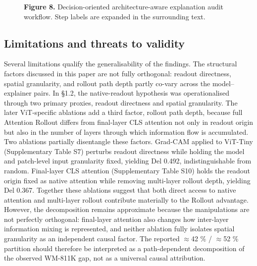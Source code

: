 \documentclass[11pt,a4paper]{article}
\begin{document}
\begin{figure}[htbp]
{
}
\caption{\textbf{Figure 8.} Decision-oriented architecture-aware explanation audit workflow. Step labels are expanded in the surrounding text.}
\end{figure}

\subsection{Limitations and threats to validity}

Several limitations qualify the generalisability of the findings. The structural factors discussed in this paper are not fully orthogonal: readout directness, spatial granularity, and rollout path depth partly co-vary across the model--explainer pairs. In \S{}1.2, the native-readout hypothesis was operationalised through two primary proxies, readout directness and spatial granularity. The later ViT-specific ablations add a third factor, rollout path depth, because full Attention Rollout differs from final-layer CLS attention not only in readout origin but also in the number of layers through which information flow is accumulated. Two ablations partially disentangle these factors. Grad-CAM applied to ViT-Tiny (Supplementary Table S7) perturbs readout directness while holding the model and patch-level input granularity fixed, yielding Del 0.492, indistinguishable from random. Final-layer CLS attention (Supplementary Table S10) holds the readout origin fixed as native attention while removing multi-layer rollout depth, yielding Del 0.367. Together these ablations suggest that both direct access to native attention and multi-layer rollout contribute materially to the Rollout advantage. However, the decomposition remains approximate because the manipulations are not perfectly orthogonal: final-layer attention also changes how inter-layer information mixing is represented, and neither ablation fully isolates spatial granularity as an independent causal factor. The reported $\approx$42 \% / $\approx$52 \% partition should therefore be interpreted as a path-dependent decomposition of the observed WM-811K gap, not as a universal causal attribution.
\end{document}
